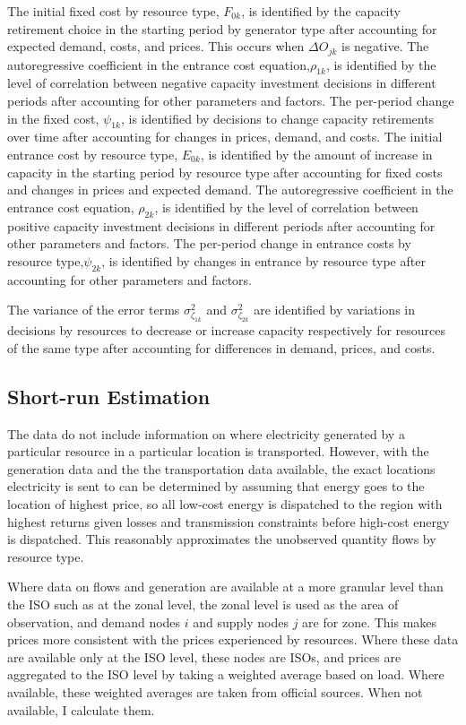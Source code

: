 \documentclass[12pt]{article}
\begin{document}
The initial fixed cost by resource type, $F_{0k}$, is identified by the capacity retirement choice in the starting period by generator type after accounting for expected demand, costs, and prices. This occurs when $\Delta O_{jk}$ is negative. The autoregressive coefficient in the entrance cost equation,$\rho_{1k}$, is identified by the level of correlation between negative capacity investment decisions in different periods after accounting for other parameters and factors. The per-period change in the fixed cost, $\psi_{1k}$, is identified by decisions to change capacity retirements over time after accounting for changes in prices, demand, and costs. The initial entrance cost by resource type, $E_{0k}$, is identified by the amount of increase in capacity in the starting period by resource type after accounting for fixed costs and changes in prices and expected demand. The autoregressive coefficient in the entrance cost equation, $\rho_{2k}$, is identified by the level of correlation between positive capacity investment decisions in different periods after accounting for other parameters and factors. The per-period change in entrance costs by resource type,$\psi_{2k}$, is identified by changes in entrance by resource type after accounting for other parameters and factors.

The variance of the error terms $\sigma_{\zeta_{1k}}^2$ and $\sigma_{\zeta_{2k}}^2$ are identified by variations in decisions by resources to decrease or increase capacity respectively for resources of the same type after accounting for differences in demand, prices, and costs.

\subsection{Short-run Estimation}

The data do not include information on where electricity generated by a particular resource in a particular location is transported. However, with the generation data and the the transportation data available, the exact locations electricity is sent to can be determined by assuming that energy goes to the location of highest price, so all low-cost energy is dispatched to the region with highest returns given losses and transmission constraints before high-cost energy is dispatched. This reasonably approximates the unobserved quantity flows by resource type.

Where data on flows and generation are available at a more granular level than the ISO such as at the zonal level, the zonal level is used as the area of observation, and demand nodes $i$ and supply nodes $j$ are for zone. This makes prices more consistent with the prices experienced by resources. Where these data are available only at the ISO level, these nodes are ISOs, and prices are aggregated to the ISO level by taking a weighted average based on load. Where available, these weighted averages are taken from official sources. When not available, I calculate them.
\end{document}
